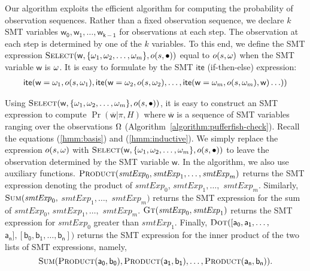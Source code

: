 Our algorithm exploits the efficient algorithm for computing the
probability of observation sequences. Rather than a fixed observation 
sequence, we declare $k$ SMT variables $\mathsf{w_0}, \mathsf{w_1},
\ldots, \mathsf{w_{k-1}}$ for observations at each step. The
observation at each step is determined by one of the $k$ variables. To
this end, we define the SMT expression
$\textmd{\textsc{Select}} (\mathsf{w}, \{ \omega_1, \omega_2, \ldots,
\omega_m\}, o (s, \bullet))$  equal to $o (s, \omega)$ when the SMT
variable $\mathsf{w}$ is $\omega$. It is easy to formulate by
the SMT $\mathsf{ite}$ (if-then-else) expression:
\begin{align*}
  \mathsf{ite} (\mathsf{w} = \omega_1, o (s, \omega_1),
  \mathsf{ite} (\mathsf{w} = \omega_2, o (s, \omega_2),
  \ldots
  ,\mathsf{ite} (\mathsf{w} = \omega_m, o (s, \omega_m), \mathsf{w})
  \ldots))
\end{align*}

Using $\textmd{\textsc{Select}} (\mathsf{w}, \{ \omega_1, \omega_2,
\ldots, \omega_m\}, o (s, \bullet))$, it is easy to construct an SMT
expression to compute $\Pr (\overline{\mathsf{w}} | \pi, H)$ where
$\overline{\mathsf{w}}$ is a sequence of SMT variables ranging over
the observations $\Omega$ (Algorithm~\ref{algorithm:pufferfish-check}).
Recall the equations (\ref{hmm:basis}) and (\ref{hmm:inductive}). We
simply replace the expression $o (s, \omega)$ with
$\textmd{\textsc{Select}} (\mathsf{w}, \{ \omega_1, \omega_2, \ldots,
\omega_m\}, o (s, \bullet))$ to leave the observation determined by the
SMT variable $\mathsf{w}$. In the algorithm, we also use auxiliary
functions. 
$\textmd{\textsc{Product}}(\mathit{smtExp}_0, \mathit{smtExp}_1,
\ldots, \mathit{smtExp}_m)$
returns the SMT expression denoting the product of
$\mathit{smtExp}_0$, $\mathit{smtExp}_1, \ldots,$
$\mathit{smtExp}_m$. Similarly, 
$\textmd{\textsc{Sum}}(\mathit{smtExp}_0,$ $\mathit{smtExp}_1, \ldots,$
$\mathit{smtExp}_m)$ returns the SMT expression for the sum
of $\mathit{smtExp}_0$, $\mathit{smtExp}_1, \ldots,$
$\mathit{smtExp}_m$. $\textmd{\textsc{Gt}} (\mathit{smtExp}_0,
\mathit{smtExp}_1)$ returns the SMT expression for
$\mathit{smtExp}_0$ greater than $\mathit{smtExp}_1$.
Finally, 
$\textmd{\textsc{Dot}} ([\mathsf{a_0}, \mathsf{a_1}, \ldots,$
$\mathsf{a_n}], [\mathsf{b_0}, \mathsf{b_1}, \ldots, \mathsf{b_n}])$
returns the SMT expression for the inner product of the two lists of
SMT expressions, namely,
\[
  \textmd{\textsc{Sum}} (
  \textmd{\textsc{Product}}(\mathsf{a_0}, \mathsf{b_0}),
  \textmd{\textsc{Product}}(\mathsf{a_1}, \mathsf{b_1}),
  \ldots,
  \textmd{\textsc{Product}}(\mathsf{a_n}, \mathsf{b_n})
  ).
\]

